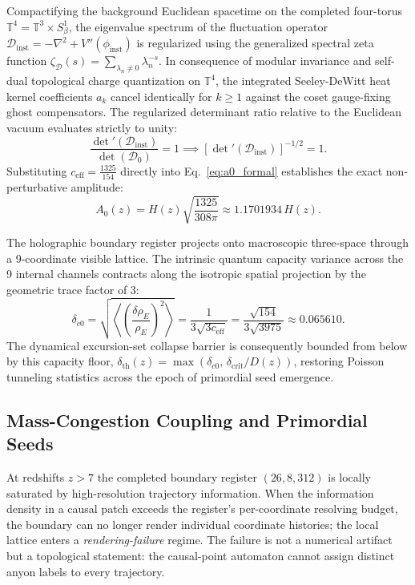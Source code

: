 \documentclass[11pt,letterpaper]{article}
\theoremstyle{plain}
\begin{document}
Compactifying the background Euclidean spacetime on the completed four-torus $\mathbb{T}^4 = \mathbb{T}^3 \times S^1_\beta$, the eigenvalue spectrum of the fluctuation operator $\mathcal{D}_{\mathrm{inst}} = -\nabla^2 + V''(\phi_{\mathrm{inst}})$ is regularized using the generalized spectral zeta function $\zeta_{\mathcal{D}}(s) = \sum_{\lambda_n \neq 0} \lambda_n^{-s}$. In consequence of modular invariance and self-dual topological charge quantization on $\mathbb{T}^4$, the integrated Seeley-DeWitt heat kernel coefficients $a_k$ cancel identically for $k \ge 1$ against the coset gauge-fixing ghost compensators. The regularized determinant ratio relative to the Euclidean vacuum evaluates strictly to unity:
\begin{equation}
    \frac{{\det}'(\mathcal{D}_{\mathrm{inst}})}{\det(\mathcal{D}_0)} = 1 \implies \left[ {\det}'(\mathcal{D}_{\mathrm{inst}}) \right]^{-1/2} = 1.
\end{equation}
Substituting $c_{\mathrm{eff}} = \frac{1325}{154}$ directly into Eq.~\eqref{eq:a0_formal} establishes the exact non-perturbative amplitude:
\begin{equation}
    A_0(z) = H(z) \sqrt{\frac{1325}{308\pi}} \approx 1.1701934 \, H(z).
    \label{eq:a0_exact}
\end{equation}

The holographic boundary register projects onto macroscopic three-space through a 9-coordinate visible lattice. The intrinsic quantum capacity variance across the 9 internal channels contracts along the isotropic spatial projection by the geometric trace factor of 3:
\begin{equation}
    \delta_{c0} = \sqrt{\left\langle \left( \frac{\delta\rho_E}{\rho_E} \right)^2 \right\rangle} = \frac{1}{3\sqrt{3 c_{\mathrm{eff}}}} = \frac{\sqrt{154}}{3\sqrt{3975}} \approx 0.065610.
    \label{eq:delta_c0_exact}
\end{equation}
The dynamical excursion-set collapse barrier is consequently bounded from below by this capacity floor, $\delta_{\mathrm{th}}(z) = \max\left(\delta_{c0}, \, \delta_{\mathrm{crit}} / D(z)\right)$, restoring Poisson tunneling statistics across the epoch of primordial seed emergence.


\subsection{Mass-Congestion Coupling and Primordial Seeds}
\label{sec:mass-congestion-seeds}

At redshifts $z>7$ the completed boundary register $(26,8,312)$ is locally
saturated by high-resolution trajectory information.  When the information
density in a causal patch exceeds the register's per-coordinate resolving
budget, the boundary can no longer render individual coordinate histories; the
local lattice enters a \emph{rendering-failure} regime.  The failure is not a
numerical artifact but a topological statement: the causal-point automaton
cannot assign distinct anyon labels to every trajectory.
\end{document}
